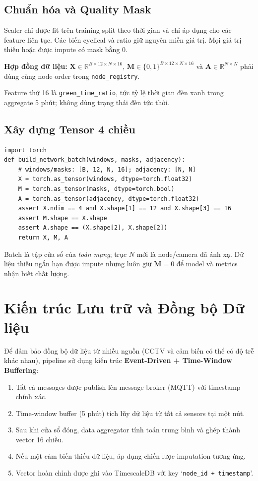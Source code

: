 \subsection{Chuẩn hóa và Quality Mask}
Scaler chỉ được fit trên training split theo thời gian và chỉ áp dụng cho các feature liên tục. Các biến cyclical và ratio giữ nguyên miền giá trị. Mọi giá trị thiếu hoặc được impute có mask bằng 0.
\begin{tcolorbox}[dangerbox]
\textbf{Hợp đồng dữ liệu:}
$\mathbf{X}\in\mathbb{R}^{B\times12\times N\times16}$,
$\mathbf{M}\in\{0,1\}^{B\times12\times N\times16}$ và
$\mathbf{A}\in\mathbb{R}^{N\times N}$ phải dùng cùng node order trong \texttt{node\_registry}.
\end{tcolorbox}
Feature thứ 16 là \texttt{green\_time\_ratio}, tức tỷ lệ thời gian đèn xanh trong aggregate 5 phút; không dùng trạng thái đèn tức thời.
\subsection{Xây dựng Tensor 4 chiều}
\begin{lstlisting}[caption={Xây dựng tensor mạng và missing mask},label={lst:tensor_build}]
import torch
def build_network_batch(windows, masks, adjacency):
    # windows/masks: [B, 12, N, 16]; adjacency: [N, N]
    X = torch.as_tensor(windows, dtype=torch.float32)
    M = torch.as_tensor(masks, dtype=torch.bool)
    A = torch.as_tensor(adjacency, dtype=torch.float32)
    assert X.ndim == 4 and X.shape[1] == 12 and X.shape[3] == 16
    assert M.shape == X.shape
    assert A.shape == (X.shape[2], X.shape[2])
    return X, M, A
\end{lstlisting}
Batch là tập cửa sổ của \emph{toàn mạng}; trục $N$ mới là node/camera đã ánh xạ. Dữ liệu thiếu ngắn hạn được impute nhưng luôn giữ $\mathbf{M}=0$ để model và metrics nhận biết chất lượng.
\section{Kiến trúc Lưu trữ và Đồng bộ Dữ liệu}
Để đảm bảo đồng bộ dữ liệu từ nhiều nguồn (CCTV và cảm biến có thể có độ trễ khác nhau), pipeline sử dụng kiến trúc \textbf{Event-Driven + Time-Window Buffering}:
\begin{enumerate}[leftmargin=1.5cm, itemsep=4pt]
  \item Tất cả messages được publish lên message broker (MQTT) với timestamp chính xác.
  \item Time-window buffer (5 phút) tích lũy dữ liệu từ tất cả sensors tại một nút.
  \item Sau khi cửa sổ đóng, data aggregator tính toán trung bình và ghép thành vector 16 chiều.
  \item Nếu một cảm biến thiếu dữ liệu, áp dụng chiến lược imputation tương ứng.
  \item Vector hoàn chỉnh được ghi vào TimescaleDB với key `\texttt{node\_id + timestamp}'.
\end{enumerate}
